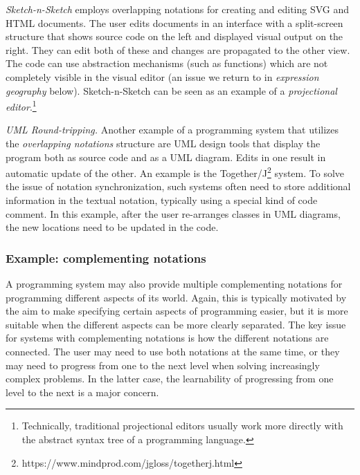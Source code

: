 \documentclass[english,submission]{programming}
\begin{document}
\emph{Sketch-n-Sketch} \cite{SnS} employs overlapping notations for
creating and editing SVG and HTML documents. The user edits documents in
an interface with a split-screen structure that shows source code on the
left and displayed visual output on the right. They can edit both of
these and changes are propagated to the other view. The code can use
abstraction mechanisms (such as functions) which are not completely
visible in the visual editor (an issue we return to in \emph{expression
geography} below). Sketch-n-Sketch can be seen as an example of a
\emph{projectional editor}.\footnote{Technically, traditional
  projectional editors usually work more directly with the abstract
  syntax tree of a programming
  language.}

\emph{UML Round-tripping.} Another example of a programming system that
utilizes the \emph{overlapping notations} structure are UML design tools
that display the program both as source code and as a UML diagram. Edits
in one result in automatic update of the other. An example is the
Together/J\footnote{https://www.mindprod.com/jgloss/togetherj.html}
system. To solve the issue of notation synchronization, such systems
often need to store additional information in the textual notation,
typically using a special kind of code comment. In this example, after
the user re-arranges classes in UML diagrams, the new locations need to
be updated in the code.

\hypertarget{example-complementing-notations}{%
\subsubsection{Example: complementing
notations}\label{example-complementing-notations}}

A programming system may also provide multiple complementing notations
for programming different aspects of its world. Again, this is typically
motivated by the aim to make specifying certain aspects of programming
easier, but it is more suitable when the different aspects can be more
clearly separated. The key issue for systems with complementing
notations is how the different notations are connected. The user may
need to use both notations at the same time, or they may need to
progress from one to the next level when solving increasingly complex
problems. In the latter case, the learnability of progressing from one
level to the next is a major concern.
\end{document}

